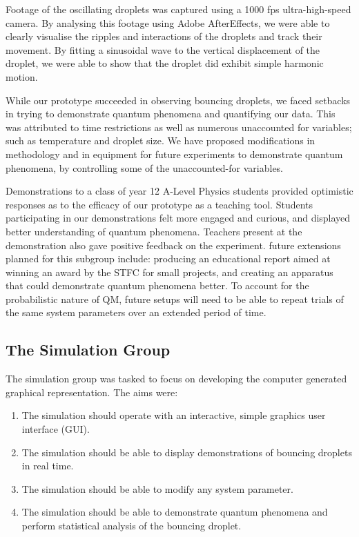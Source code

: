 Footage of the oscillating droplets was captured using a 1000 fps ultra-high-speed camera. By analysing this footage using Adobe AfterEffects, we were able to clearly visualise the ripples and interactions of the droplets and track their movement. By fitting a sinusoidal wave to the vertical displacement of the droplet, we were able to show that the droplet did exhibit simple harmonic motion. 

While our prototype succeeded in observing bouncing droplets, we faced setbacks in trying to demonstrate quantum phenomena and quantifying our data. This was attributed to time restrictions as well as numerous unaccounted for variables; such as temperature and droplet size. We have proposed modifications in methodology and in equipment for future experiments to demonstrate quantum phenomena, by controlling some of the unaccounted-for variables.

Demonstrations to a class of year 12 A-Level Physics students provided optimistic responses as to the efficacy of our prototype as a teaching tool. Students participating in our demonstrations felt more engaged and curious, and displayed better understanding of quantum phenomena. Teachers present at the demonstration also gave positive feedback on the experiment. 
future extensions planned for this subgroup include: producing an educational report aimed at winning an award by the STFC for small projects, and creating an apparatus that could demonstrate quantum phenomena better. To account for the probabilistic nature of QM, future setups will need to be able to repeat trials of the same system parameters over an extended period of time.

\subsection*{The Simulation Group}
The simulation group was tasked to focus on developing the computer generated graphical representation. The aims were:

\begin{enumerate}
    \item The simulation should operate with an interactive, simple graphics user interface (GUI).
    \item The simulation should be able to display demonstrations of bouncing
droplets in real time.
    \item The simulation should be able to modify any system parameter.
\item The simulation should be able to demonstrate quantum phenomena and perform statistical analysis of the bouncing droplet. 
\end{enumerate}

